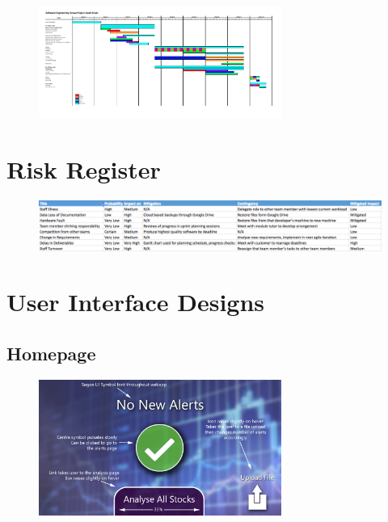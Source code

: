 \documentclass[11pt, oneside, a4paper]{article}
\begin{document}
\begin{figure}[h]
	\centering
		\includegraphics[width=300px]{Gantt&Activity.png}
	\caption{}
	\label{GanttActivity}
\end{figure}

\section{Risk Register}

\begin{figure}[h]
	\centering
		\includegraphics[width=500px]{RiskRegister.png}
	\caption{}
	\label{RiskRegister}
\end{figure}

\section{User Interface Designs}

\subsection{Homepage}

\begin{figure}[h]
	\centering
		\includegraphics[width=300px]{HomepageUIDesign.png}
	\caption{}
	\label{HomeUI}
\end{figure}
\end{document}
